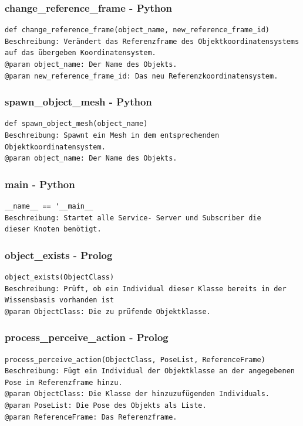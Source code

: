 \documentclass{suturo}
\begin{document}
\subsubsection{change\_reference\_frame - Python}
\begin{verbatim}
def change_reference_frame(object_name, new_reference_frame_id)
Beschreibung: Verändert das Referenzframe des Objektkoordinatensystems 
auf das übergeben Koordinatensystem.
@param object_name: Der Name des Objekts.
@param new_reference_frame_id: Das neu Referenzkoordinatensystem.
\end{verbatim}

\subsubsection{spawn\_object\_mesh - Python}
\begin{verbatim}
def spawn_object_mesh(object_name)
Beschreibung: Spawnt ein Mesh in dem entsprechenden Objektkoordinatensystem.
@param object_name: Der Name des Objekts.
\end{verbatim}

\subsubsection{main - Python}
\begin{verbatim}
__name__ == '__main__
Beschreibung: Startet alle Service- Server und Subscriber die
dieser Knoten benötigt.
\end{verbatim}

\subsubsection{object\_exists - Prolog}
\begin{verbatim}
object_exists(ObjectClass)
Beschreibung: Prüft, ob ein Individual dieser Klasse bereits in der
Wissensbasis vorhanden ist
@param ObjectClass: Die zu prüfende Objektklasse.
\end{verbatim}

\subsubsection{process\_perceive\_action - Prolog}
\begin{verbatim}
process_perceive_action(ObjectClass, PoseList, ReferenceFrame)
Beschreibung: Fügt ein Individual der Objektklasse an der angegebenen 
Pose im Referenzframe hinzu.
@param ObjectClass: Die Klasse der hinzuzufügenden Individuals.
@param PoseList: Die Pose des Objekts als Liste.
@param ReferenceFrame: Das Referenzframe.
\end{verbatim}
\end{document}
